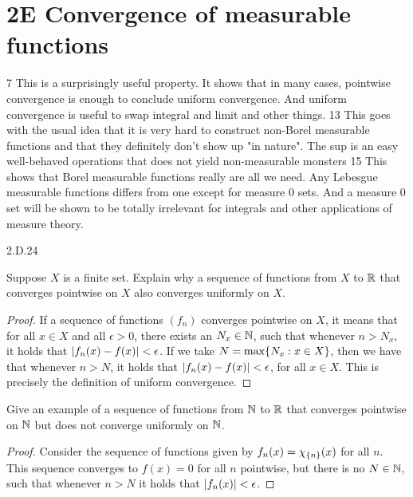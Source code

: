 \section{2E Convergence of measurable functions}

7 This is a surprisingly useful property. It shows that in many cases, pointwise convergence is enough to conclude uniform convergence. And uniform convergence is useful to swap integral and limit and other things.
13 This goes with the usual idea that it is very hard to construct non-Borel measurable functions and that they definitely don't show up "in nature". The sup is an easy well-behaved operations that does not yield non-measurable monsters
15 This shows that Borel measurable functions really are all we need. Any Lebesgue measurable functions differs from one except for measure 0 sets. And a measure 0 set will be shown to be totally irrelevant for integrals and other applications of measure theory.

2.D.24

\begin{exercise}{1}
Suppose $X$ is a finite set.
Explain why a sequence of functions from $X$ to $\mathbb{R}$ that converges pointwise on $X$ also converges uniformly on $X$.
\end{exercise}
\begin{proof}
If a sequence of functions $(f_n)$ converges pointwise on $X$, it means that for all $x\in X$ and all $\epsilon>0$, there exists an $N_x \in \mathbb{N}$, such that whenever $n > N_x$, it holds that $\left\lvert f_n(x) -f(x)\right\rvert < \epsilon$.
If we take $N = \max \{N_x: x \in X\}$, then we have that whenever $n>N$, it holds that $\left\lvert f_n(x) - f(x)\right\rvert < \epsilon$, for all $x \in X$.
This is precisely the definition of uniform convergence.
\end{proof} 

\begin{exercise}{2}
Give an example of a sequence of functions from $\mathbb{N}$ to $\mathbb{R}$ that converges pointwise on $\mathbb{N}$ but does not converge uniformly on $\mathbb{N}$.
\end{exercise}
\begin{proof}
Consider the sequence of functions given by $f_n(x) = \chi_{\{n\}}(x)$ for all $n$.
This sequence converges to $f(x) = 0$ for all $n$ pointwise, but there is no $N \in \mathbb{N}$, such that whenever $n>N$ it holds that $\left\lvert f_n(x)\right\rvert < \epsilon$.
\end{proof} 

